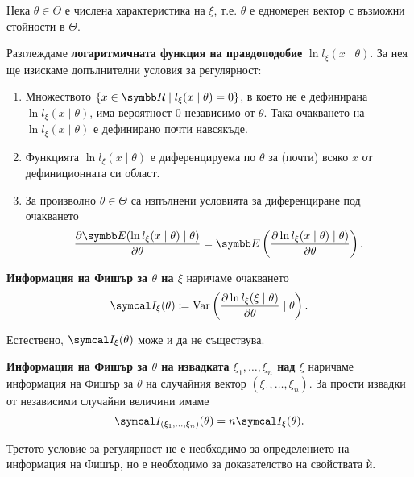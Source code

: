 \documentclass[numbers=endperiod, bibliography=totocnumbered]{scrartcl}
\begin{document}
\begin{definition}\label{def:fisher_information}
  Нека \( \theta \in \Theta \) е числена характеристика на \( \xi \), т.е. \( \theta \) е едномерен вектор с възможни стойности в \( \Theta \).

  Разглеждаме \textbf{логаритмичната функция на правдоподобие} \( \ln l_\xi(x \mid \theta) \). За нея ще изискаме допълнителни условия за регулярност:
  \begin{enumerate}
    \item Множеството \( \{ x \in \R \mid l_\xi(x \mid \theta) = 0 \} \), в което не е дефинирана \( \ln l_\xi(x \mid \theta) \), има вероятност \( 0 \) независимо от \( \theta \). Така очакването на \( \ln l_\xi(x \mid \theta) \) е дефинирано почти навсякъде.
    \item Функцията \( \ln l_\xi(x \mid \theta) \) е диференцируема по \( \theta \) за (почти) всяко \( x \) от дефиниционната си област.
    \item За произволно \( \theta \in \Theta \) са изпълнени условията за диференциране под очакването
    \begin{equation*}
      \frac {\partial \Expect(\ln l_\xi(x \mid \theta) \mid \theta)} {\partial \theta}
      =
      \Expect\left( \frac {\partial \ln l_\xi(x \mid \theta) \mid \theta)} {\partial \theta} \right).
    \end{equation*}
  \end{enumerate}

  \textbf{Информация на Фишър за \( \theta \) на \( \xi \)} наричаме очакването
  \begin{equation*}
    \FisherInfo_\xi(\theta) \coloneqq \Var\left( \frac {\partial \ln l_\xi(\xi \mid \theta)} {\partial \theta} \mid \theta \right).
  \end{equation*}

  Естествено, \( \FisherInfo_\xi(\theta) \) може и да не съществува.

  \textbf{Информация на Фишър за \( \theta \) на извадката \( \xi_1, \ldots, \xi_n \) над \( \xi \)} наричаме информация на Фишър за \( \theta \) на случайния вектор \( (\xi_1, \ldots, \xi_n) \). За прости извадки от независими случайни величини имаме
  \begin{equation*}
    \FisherInfo_{(\xi_1, \ldots, \xi_n)}(\theta) = n \FisherInfo_\xi(\theta).
  \end{equation*}
\end{definition}

\begin{remark}
  Третото условие за регулярност не е необходимо за определението на информация на Фишър, но е необходимо за доказателство на свойствата ѝ.
\end{remark}
\end{document}
